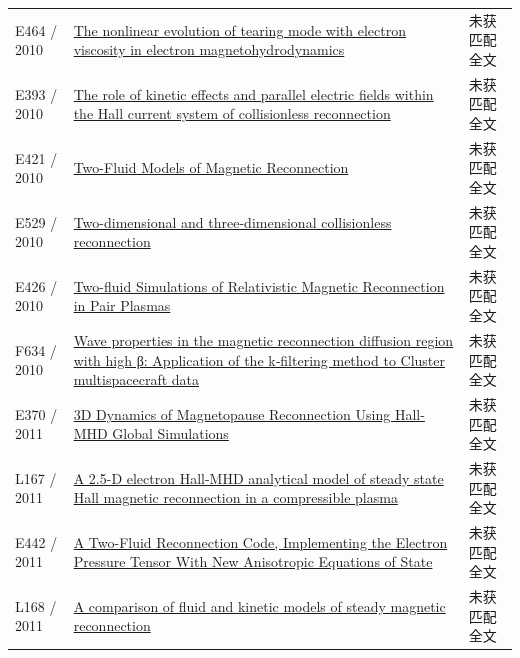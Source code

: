 \documentclass[UTF8,a4paper,11pt,openany,fontset=fandol]{ctexbook}
\begin{document}
\begin{longtable}{P{24mm}P{97mm}P{27mm}}
E464 / 2010 & \href{https://doi.org/10.1063/1.3328819}{The nonlinear evolution of tearing mode with electron viscosity in electron magnetohydrodynamics} & 未获匹配全文\\

E393 / 2010 & \href{https://ui.adsabs.harvard.edu/abs/2010APS..DPPCP9128E/abstract}{The role of kinetic effects and parallel electric fields within the Hall current system of collisionless reconnection} & 未获匹配全文\\

E421 / 2010 & \href{https://research.manchester.ac.uk/en/studentTheses/d99f1bda-cb55-47e2-8d82-ebe240e98456}{Two-Fluid Models of Magnetic Reconnection} & 未获匹配全文\\

E529 / 2010 & \href{http://edoc.mpg.de/472531}{Two-dimensional and three-dimensional collisionless reconnection} & 未获匹配全文\\

E426 / 2010 & \href{https://ui.adsabs.harvard.edu/abs/2010AAS...21545326Z/abstract}{Two-fluid Simulations of Relativistic Magnetic Reconnection in Pair Plasmas} & 未获匹配全文\\

F634 / 2010 & \href{https://doi.org/10.1029/2010ja015335}{Wave properties in the magnetic reconnection diffusion region with high β: Application of the k‐filtering method to Cluster multispacecraft data} & 未获匹配全文\\

E370 / 2011 & \href{http://ui.adsabs.harvard.edu/abs/2011AGUFMSM21A1983M/abstract}{3D Dynamics of Magnetopause Reconnection Using Hall-MHD Global Simulations} & 未获匹配全文\\

L167 / 2011 & \href{https://doi.org/10.1029/2010ja015942}{A 2.5-D electron Hall-MHD analytical model of steady state Hall magnetic reconnection in a compressible plasma} & 未获匹配全文\\

E442 / 2011 & \href{http://absimage.aps.org/image/DPP11/MWS_DPP11-2011-000787.pdf}{A Two-Fluid Reconnection Code,  Implementing the Electron Pressure Tensor With New Anisotropic Equations of State} & 未获匹配全文\\

L168 / 2011 & \href{https://doi.org/10.1063/1.3568828}{A comparison of fluid and kinetic models of steady magnetic reconnection} & 未获匹配全文\\


\end{longtable}
\end{document}
